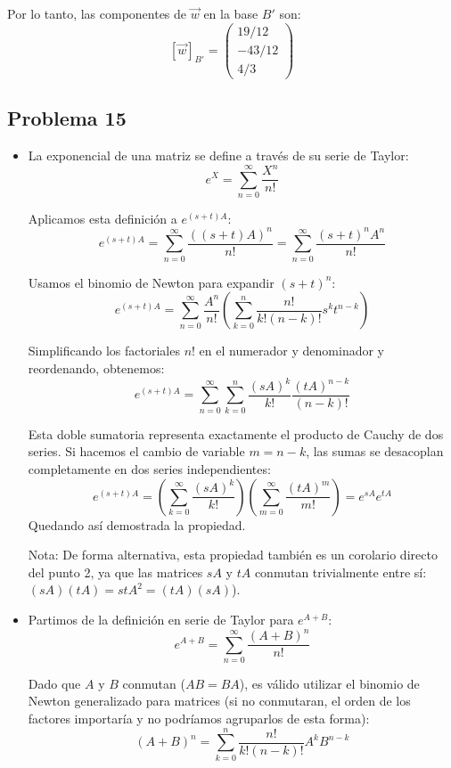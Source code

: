 \documentclass[11pt,spanish]{article}
\begin{document}
\begin{itemize}
Por lo tanto, las componentes de $\vec{w}$ en la base $B'$ son:
$$[\vec{w}]_{B'} = \begin{pmatrix} 19/12 \\ -43/12 \\ 4/3 \end{pmatrix}$$

\end{itemize}

\subsection*{Problema 15}

\begin{itemize}
\item
La exponencial de una matriz se define a través de su serie de Taylor:
$$e^X = \sum_{n=0}^{\infty} \frac{X^n}{n!}$$

Aplicamos esta definición a $e^{(s+t)A}$:
$$e^{(s+t)A} = \sum_{n=0}^{\infty} \frac{((s+t)A)^n}{n!} = \sum_{n=0}^{\infty} \frac{(s+t)^n A^n}{n!}$$

Usamos el binomio de Newton para expandir $(s+t)^n$:
$$e^{(s+t)A} = \sum_{n=0}^{\infty} \frac{A^n}{n!} \left( \sum_{k=0}^{n} \frac{n!}{k!(n-k)!} s^k t^{n-k} \right)$$

Simplificando los factoriales $n!$ en el numerador y denominador y reordenando, obtenemos:
$$e^{(s+t)A} = \sum_{n=0}^{\infty} \sum_{k=0}^{n} \frac{(sA)^k}{k!} \frac{(tA)^{n-k}}{(n-k)!}$$

Esta doble sumatoria representa exactamente el producto de Cauchy de dos series. Si hacemos el cambio de variable $m = n-k$, las sumas se desacoplan completamente en dos series independientes:
$$e^{(s+t)A} = \left( \sum_{k=0}^{\infty} \frac{(sA)^k}{k!} \right) \left( \sum_{m=0}^{\infty} \frac{(tA)^m}{m!} \right) = e^{sA} e^{tA}$$
Quedando así demostrada la propiedad.

Nota: De forma alternativa, esta propiedad también es un corolario directo del punto 2, ya que las matrices $sA$ y $tA$ conmutan trivialmente entre sí: $(sA)(tA) = stA^2 = (tA)(sA)$).

\item
Partimos de la definición en serie de Taylor para $e^{A+B}$:
$$e^{A+B} = \sum_{n=0}^{\infty} \frac{(A+B)^n}{n!}$$

Dado que $A$ y $B$ conmutan ($AB = BA$), es válido utilizar el binomio de Newton generalizado para matrices (si no conmutaran, el orden de los factores importaría y no podríamos agruparlos de esta forma):
$$(A+B)^n = \sum_{k=0}^{n} \frac{n!}{k!(n-k)!} A^k B^{n-k}$$


\end{itemize}
\end{document}
